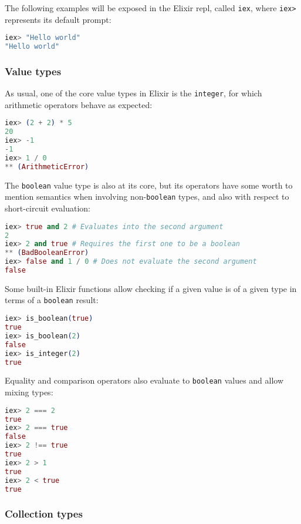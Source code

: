 The following examples will be exposed in the Elixir \gls{repl}, 
called \verb|iex|, where \verb|iex>| represents its default prompt:

\begin{lstlisting}[language=elixir,numbers=none,frame=none]
iex> "Hello world"
"Hello world"
\end{lstlisting}

\subsubsection{Value types}

As usual, one of the core value types in Elixir is the \verb|integer|, for
which arithmetic operators behave as expected:

\begin{lstlisting}[language=elixir,numbers=none,frame=none]
iex> (2 + 2) * 5
20
iex> -1
-1
iex> 1 / 0
** (ArithmeticError)
\end{lstlisting}

The \verb|boolean| value type is also at its core, but its operators have some
worth to mention semantics when involving non-\verb|boolean| types, and also 
with respect to short-circuit evaluation:

\begin{lstlisting}[language=elixir,numbers=none,frame=none]
iex> true and 2 # Evaluates into the second argument
2
iex> 2 and true # Requires the first one to be a boolean
** (BadBooleanError)
iex> false and 1 / 0 # Does not evaluate the second argument
false
\end{lstlisting}

Some built-in Elixir functions allow checking if a given value is of a given
type in terms of a \verb|boolean| result:

\begin{lstlisting}[language=elixir,numbers=none,frame=none]
iex> is_boolean(true)
true
iex> is_boolean(2)
false
iex> is_integer(2)
true
\end{lstlisting}

Equality and comparison operators also evaluate to \verb|boolean| values and
allow mixing types:

\begin{lstlisting}[language=elixir,numbers=none,frame=none]
iex> 2 === 2
true
iex> 2 === true
false
iex> 2 !== true
true
iex> 2 > 1
true
iex> 2 < true
true
\end{lstlisting}

\subsubsection{Collection types}

